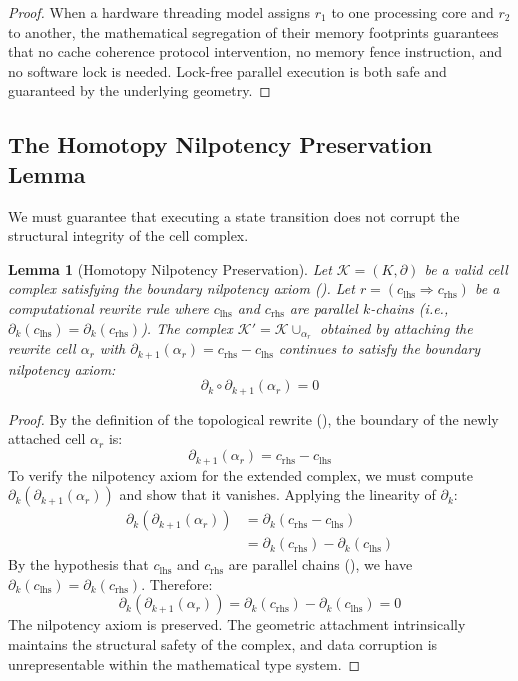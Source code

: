 \documentclass[manuscript, nonacm, review=false]{acmart}
\theoremstyle{definition}
\theoremstyle{plain}
\newtheorem{lemma}[theorem]{Lemma}
\newcommand{\K}{\mathcal{K}}
\begin{document}
\begin{proof}
When a hardware threading model assigns $r_1$ to one processing core and $r_2$ to another, the mathematical segregation of their memory footprints guarantees that no cache coherence protocol intervention, no memory fence instruction, and no software lock is needed. Lock-free parallel execution is both safe and guaranteed by the underlying geometry.
\end{proof}


\subsection{The Homotopy Nilpotency Preservation Lemma}
\label{subsec:nilpotency_lemma}

We must guarantee that executing a state transition does not corrupt the structural integrity of the cell complex.

\begin{lemma}[Homotopy Nilpotency Preservation]
\label{lem:nilpotency_preservation}
Let $\K = (K, \partial)$ be a valid cell complex satisfying the boundary nilpotency axiom (). Let $r = (c_{\text{lhs}} \Rightarrow c_{\text{rhs}})$ be a computational rewrite rule where $c_{\text{lhs}}$ and $c_{\text{rhs}}$ are parallel $k$-chains (i.e., $\partial_k(c_{\text{lhs}}) = \partial_k(c_{\text{rhs}})$). The complex $\K' = \K \cup_{\alpha_r}$ obtained by attaching the rewrite cell $\alpha_r$ with $\partial_{k+1}(\alpha_r) = c_{\text{rhs}} - c_{\text{lhs}}$ continues to satisfy the boundary nilpotency axiom:
\begin{equation}
    \partial_k \circ \partial_{k+1}(\alpha_r) = 0
\end{equation}
\end{lemma}

\begin{proof}
By the definition of the topological rewrite (), the boundary of the newly attached cell $\alpha_r$ is:
\begin{equation}
    \partial_{k+1}(\alpha_r) = c_{\text{rhs}} - c_{\text{lhs}}
\end{equation}
To verify the nilpotency axiom for the extended complex, we must compute $\partial_k(\partial_{k+1}(\alpha_r))$ and show that it vanishes. Applying the linearity of $\partial_k$:
\begin{align}
    \partial_k(\partial_{k+1}(\alpha_r)) &= \partial_k(c_{\text{rhs}} - c_{\text{lhs}}) \\
    &= \partial_k(c_{\text{rhs}}) - \partial_k(c_{\text{lhs}})
\end{align}
By the hypothesis that $c_{\text{lhs}}$ and $c_{\text{rhs}}$ are parallel chains (), we have $\partial_k(c_{\text{lhs}}) = \partial_k(c_{\text{rhs}})$. Therefore:
\begin{equation}
    \partial_k(\partial_{k+1}(\alpha_r)) = \partial_k(c_{\text{rhs}}) - \partial_k(c_{\text{lhs}}) = 0
\end{equation}
The nilpotency axiom is preserved. The geometric attachment intrinsically maintains the structural safety of the complex, and data corruption is unrepresentable within the mathematical type system.
\end{proof}
\end{document}
